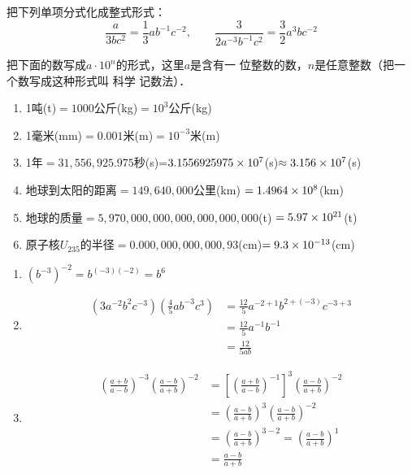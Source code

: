 \begin{example}
    把下列单项分式化成整式形式：
    \[\frac{a}{3bc^2}=\frac{1}{3}ab^{-1}c^{-2},\qquad \frac{3}{2a^{-3}b^{-1}c^2}=\frac{3}{2}a^3bc^{-2}  \]
\end{example}

\begin{example}
    把下面的数写成$a\cdot 10^n$的形式，这里$a$是含有一
位整数的数，$n$是任意整数（把一个数写成这种形式叫 科学
记数法）．
    \begin{enumerate}
        \item 1吨(t)$=1000$公斤(kg)$=10^3$公斤(kg)
        \item  1毫米(mm)$=0.001$米(m)$=10^{-3}$米(m)
        \item  1年$=31,556,925.975$秒(s)=$3.1556925975\times10^7$(s)$\approx 3.156\times10^7$(s)
        \item   地球到太阳的距离$=149,640,000$公里(km)
        $=1.4964\times10^8$(km)
        \item    地球的质量$=5,970,000,000,000,000,000,000$(t)
        $=5.97\times10^{21}$(t)
        \item    原子核$U_{235}$的半径$=0.000,000,000,000,93$(cm)$=9.3\times10^{-13}$(cm)
    \end{enumerate}
\end{example}

\begin{example}
\begin{enumerate}
    \item $(b^{-3})^{-2}=b^{(-3)(-2)}=b^6$
    \item \[\begin{split}
        \left(3a^{-2}b^2c^{-3}\right)\left(\frac{4}{5}ab^{-3}c^3\right)&=\frac{12}{5}a^{-2+ 1}b^{2+(-3)}c^{-3+3}\\
        &=\frac{12}{5}a^{-1}b^{-1}\\
        &=\frac{12}{5ab}
    \end{split}\]
    \item \[\begin{split}
        \left(\frac{a+b}{a-b}\right)^{-3}\left(\frac{a-b}{a+b}\right)^{-2}&=\left[\left(\frac{a+b}{a-b}\right)^{-1}\right]^{3} \left(\frac{a-b}{a+b}\right)^{-2}\\
        &=\left(\frac{a-b}{a+b}\right)^{3}\left(\frac{a-b}{a+b}\right)^{-2}\\
        &=\left(\frac{a-b}{a+b}\right)^{3-2}=\left(\frac{a-b}{a+b}\right)^{1}\\
        &=\frac{a-b}{a+b}
    \end{split}\]
\end{enumerate}
\end{example}

